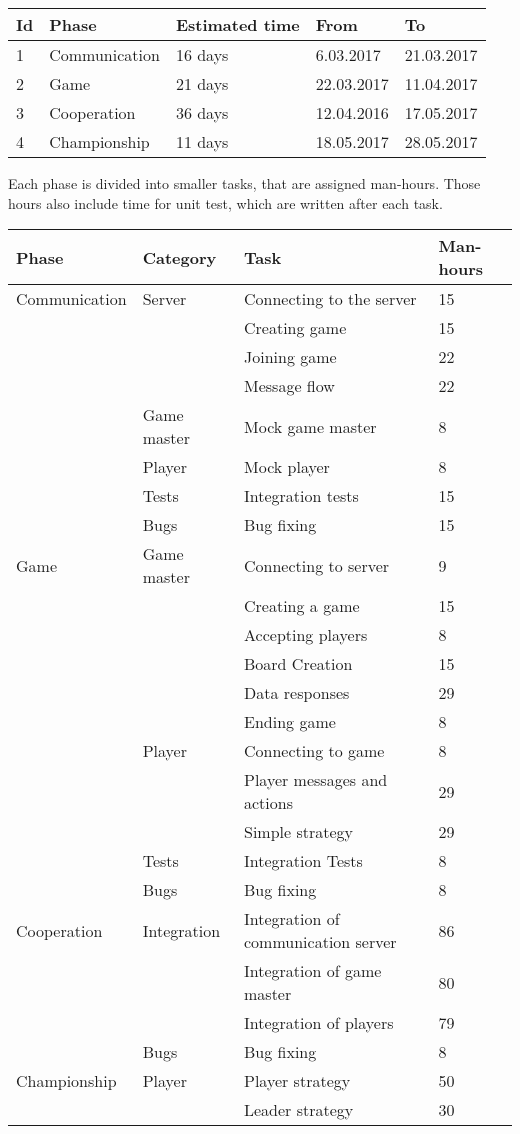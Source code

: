 \documentclass[11pt,a4paper]{article}
\begin{document}
\begin{longtable}{| p{1cm} | p{4cm} | p{3cm} | l | l |}
\hline
\textbf{Id} & \textbf{Phase} & \textbf{Estimated time} & \textbf{From} & \textbf{To} \\ \hline
1 & Communication & 16 days & 6.03.2017 & 21.03.2017 \\ \hline
2 & Game & 21 days & 22.03.2017 & 11.04.2017 \\ \hline
3 & Cooperation & 36 days & 12.04.2016 & 17.05.2017 \\ \hline
4 & Championship & 11 days & 18.05.2017 & 28.05.2017 \\ \hline
\end{longtable}

Each phase is divided into smaller tasks, that are assigned man-hours. Those hours also include time for unit test, which are written after each task.

\begin{longtable}{| p{3.5cm} | p{3cm} | p{4cm} | l |} \hline
\textbf{Phase} & \textbf{Category} & \textbf{Task} & \textbf{Man-hours} \\ \hline
Communication & Server & Connecting to the server & 15 \\ \cline{3-4}
& & Creating game & 15 \\ \cline{3-4}
& & Joining game & 22 \\ \cline{3-4}
& & Message flow & 22 \\ \cline{2-4}
& Game master & Mock game master & 8 \\ \cline{2-4}
& Player & Mock player & 8 \\ \cline{2-4}
& Tests & Integration tests & 15 \\ \cline{2-4}
& Bugs & Bug fixing & 15 \\ \hline
Game & Game master & Connecting to server & 9 \\ \cline{3-4}
& & Creating a game & 15 \\ \cline{3-4}
& & Accepting players & 8 \\ \cline{3-4}
& & Board Creation & 15 \\ \cline{3-4}
& & Data responses & 29 \\ \cline{3-4}
& & Ending game & 8 \\ \cline{2-4}
& Player & Connecting to game & 8 \\ \cline{3-4}
& & Player messages and actions & 29 \\ \cline{3-4}
& & Simple strategy & 29 \\ \cline{2-4}
& Tests & Integration Tests & 8 \\ \cline{2-4}
& Bugs & Bug fixing & 8 \\ \hline
Cooperation & Integration & Integration of communication server & 86 \\ \cline{3-4}
& & Integration of game master & 80 \\ \cline{3-4}
& & Integration of players & 79 \\ \cline{2-4}
& Bugs & Bug fixing & 8 \\ \hline
Championship & Player & Player strategy & 50 \\ \cline{3-4}
& & Leader strategy & 30 \\ \hline
\end{longtable}
\end{document}
